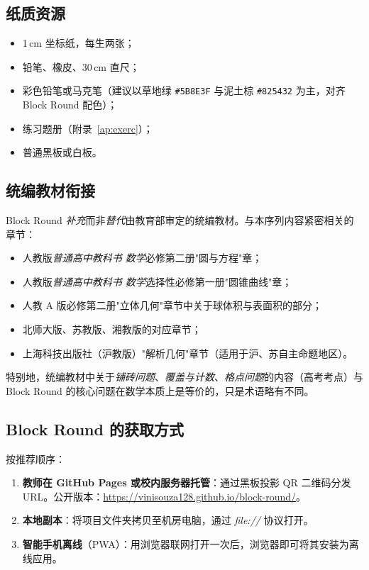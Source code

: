 \documentclass[12pt,a4paper]{scrartcl}
\begin{document}
\subsection{纸质资源}
\begin{itemize}[leftmargin=1.3em,itemsep=0.15em,topsep=0.3em]
  \item 1\,cm 坐标纸，每生两张；
  \item 铅笔、橡皮、30\,cm 直尺；
  \item 彩色铅笔或马克笔（建议以草地绿 \texttt{\#5B8E3F} 与泥土棕 \texttt{\#825432} 为主，对齐 Block Round 配色）；
  \item 练习题册（附录~\ref{ap:exerc}）；
  \item 普通黑板或白板。
\end{itemize}

\subsection{统编教材衔接}\label{sec:pnld}

Block Round \emph{补充}而非\emph{替代}由教育部审定的统编教材。与本序列内容紧密相关的章节：

\begin{itemize}[leftmargin=1.3em,itemsep=0.1em,topsep=0.2em,nosep]
  \item 人教版\emph{普通高中教科书 数学}必修第二册"圆与方程"章；
  \item 人教版\emph{普通高中教科书 数学}选择性必修第一册"圆锥曲线"章；
  \item 人教 A 版必修第二册"立体几何"章节中关于球体积与表面积的部分；
  \item 北师大版、苏教版、湘教版的对应章节；
  \item 上海科技出版社（沪教版）"解析几何"章节（适用于沪、苏自主命题地区）。
\end{itemize}

特别地，统编教材中关于\emph{铺砖问题}、\emph{覆盖与计数}、\emph{格点问题}的内容（高考考点）与 Block Round 的核心问题在数学本质上是等价的，只是术语略有不同。

\subsection{Block Round 的获取方式}

按推荐顺序：

\begin{enumerate}[leftmargin=1.5em,itemsep=0.15em,topsep=0.3em]
  \item \textbf{教师在 GitHub Pages 或校内服务器托管}：通过黑板投影 QR 二维码分发 URL。公开版本：\url{https://vinisouza128.github.io/block-round/}。
  \item \textbf{本地副本}：将项目文件夹拷贝至机房电脑，通过 \emph{file://} 协议打开。
  \item \textbf{智能手机离线}（PWA）：用浏览器联网打开一次后，浏览器即可将其安装为离线应用。
\end{enumerate}
\end{document}
